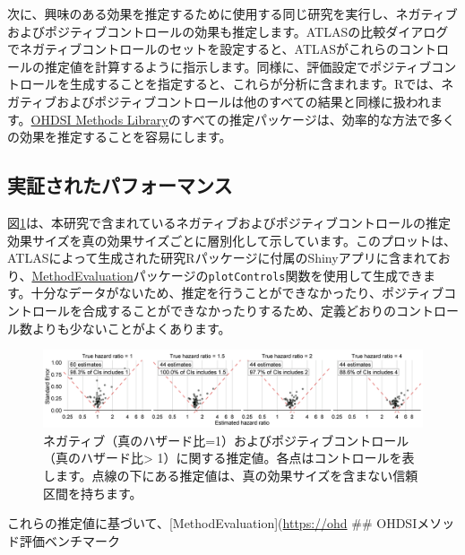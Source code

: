 \documentclass[
  11pt]{book}
\theoremstyle{definition}
\theoremstyle{definition}
\theoremstyle{definition}
\theoremstyle{definition}
\theoremstyle{remark}
\begin{document}
次に、興味のある効果を推定するために使用する同じ研究を実行し、ネガティブおよびポジティブコントロールの効果も推定します。ATLASの比較ダイアログでネガティブコントロールのセットを設定すると、ATLASがこれらのコントロールの推定値を計算するように指示します。同様に、評価設定でポジティブコントロールを生成することを指定すると、これらが分析に含まれます。Rでは、ネガティブおよびポジティブコントロールは他のすべての結果と同様に扱われます。\href{https://ohdsi.github.io/MethodsLibrary/}{OHDSI Methods Library}のすべての推定パッケージは、効率的な方法で多くの効果を推定することを容易にします。

\subsection{実証されたパフォーマンス}\label{ux5b9fux8a3cux3055ux308cux305fux30d1ux30d5ux30a9ux30fcux30deux30f3ux30b9}

図\ref{fig:controls}は、本研究で含まれているネガティブおよびポジティブコントロールの推定効果サイズを真の効果サイズごとに層別化して示しています。このプロットは、ATLASによって生成された研究Rパッケージに付属のShinyアプリに含まれており、\href{https://ohdsi.github.io/MethodEvaluation/}{MethodEvaluation}パッケージの\texttt{plotControls}関数を使用して生成できます。十分なデータがないため、推定を行うことができなかったり、ポジティブコントロールを合成することができなかったりするため、定義どおりのコントロール数よりも少ないことがよくあります。

\begin{figure}

{\centering \includegraphics[width=1\linewidth]{images/MethodValidity/controls} 

}

\caption{ネガティブ（真のハザード比=1）およびポジティブコントロール（真のハザード比> 1）に関する推定値。各点はコントロールを表します。点線の下にある推定値は、真の効果サイズを含まない信頼区間を持ちます。}\label{fig:controls}
\end{figure}

これらの推定値に基づいて、{[}MethodEvaluation{]}(\url{https://ohd}
\#\# OHDSIメソッド評価ベンチマーク

\end{document}
